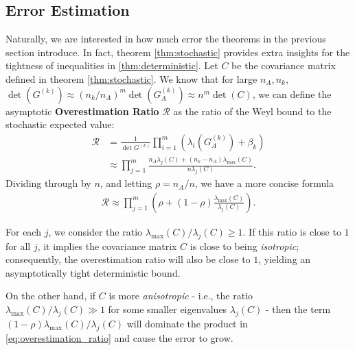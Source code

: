 \documentclass{article}
\theoremstyle{plain}
\theoremstyle{definition}
\theoremstyle{remark}
\begin{document}
\subsection{Error Estimation}
Naturally, we are interested in how much error the theorems in the previous section introduce. In fact, theorem \ref{thm:stochastic} provides extra insights for the tightness of inequalities in \ref{thm:deterministic}. Let $C$ be the covariance matrix defined in theorem \ref{thm:stochastic}. We know that for large $n_A, n_k$, $\det(G^{(k)})\approx\left( n_k/n_A \right)^m \det(G_A^{(k)}) \approx n^m \det (C)$, we can define the asymptotic \textbf{Overestimation Ratio} $\mathcal{R}$ as the ratio of the Weyl bound to the stochastic expected value:
\begin{align}
    \mathcal{R} &= \frac{1}{\det G^{(k)}} \prod_{i=1}^m \left(\lambda_i(G_A^{(k)}) + \beta_k\right) 
    \nonumber \\
    &\approx \prod_{j=1}^m \frac{n_A \lambda_j(C) + (n_k-n_A) \lambda_{\max}(C)}{n \lambda_j(C)}.
\end{align}
Dividing through by $n$, and letting $\rho = n_A/n$, we have a more concise formula
\begin{align} \label{eq:overestimation_ratio}
    \mathcal{R} \approx \prod_{j=1}^m \left( \rho + (1-\rho) \frac{\lambda_{\max}(C)}{\lambda_j(C)} \right).
\end{align}

For each $j$, we consider the ratio $\lambda_{\max}(C) / \lambda_j(C) \ge 1$. If this ratio is close to $1$ for all $j$, it implies the covariance matrix $C$ is close to being \textit{isotropic}; consequently, the overestimation ratio will also be close to $1$, yielding an asymptotically tight deterministic bound.

On the other hand, if $C$ is more \textit{anisotropic} - i.e., the ratio $\lambda_{\max}(C) / \lambda_j(C) \gg 1$ for some smaller eigenvalues $\lambda_j(C)$ - then the term $(1-\rho) \lambda_{\max}(C)/\lambda_j(C)$ will dominate the product in \eqref{eq:overestimation_ratio} and cause the error to grow.
\end{document}

